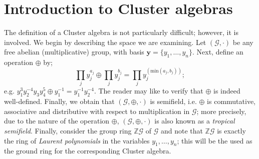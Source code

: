 \chapter{Introduction to Cluster algebras}
The definition of a Cluster algebra is not particularly difficult; however, it is involved. We begin by describing the space we are examining. Let $(\mathcal{G}, \cdot)$ be any free abelian (multiplicative) group, with basis $\mathbf{y} = \{y_1,\dots,y_n\}$. Next, define an operation $\oplus$ by;
\begin{equation}
    \prod_j y_j^{a_j} \oplus \prod_j y_j^{b_j} = \prod_j y_j^{(\text{min}(a_j,b_j))};  
\end{equation}
e.g. $y_1^3y_2^{-4}y_3y_4^5 \oplus y_1^{-1} = y_1^{-1}y_2^{-4}$. The reader may like to verify that $\oplus$ is indeed well-defined. Finally, we obtain that $(\mathcal{G},\oplus, \cdot)$ is semifield, i.e. $\oplus$ is commutative, associative and distributive with respect to multiplication in $\mathcal{G}$; more precisely, due to the nature of the operation $\oplus$, $(\mathcal{G},\oplus, \cdot)$ is also known as a \emph{tropical semifield}. Finally, consider the group ring $\mathbb{Z}\mathcal{G}$ of $\mathcal{G}$ and note that $\mathbb{Z}\mathcal{G}$ is exactly the ring of \emph{Laurent polynomials} in the variables $y_1,\dots, y_n$; this will be the used as the ground ring for the corresponding Cluster algebra. 
